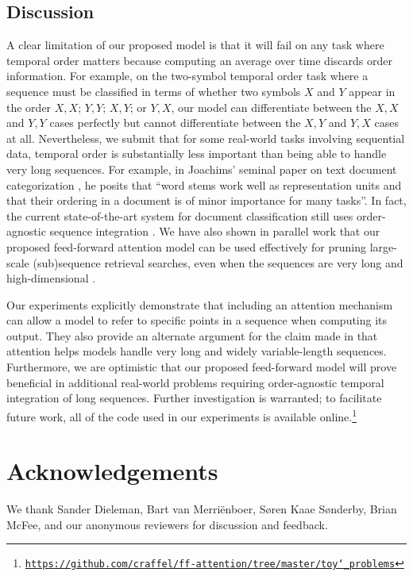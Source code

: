 \documentclass{article} %
\begin{document}
\subsection{Discussion}
\label{sec:discussion}

A clear limitation of our proposed model is that it will fail on any task where temporal order matters because computing an average over time discards order information.
For example, on the two-symbol temporal order task \citep{hochreiter1997long} where a sequence must be classified in terms of whether two symbols $X$ and $Y$ appear in the order $X, X$; $Y, Y$; $X, Y$; or $Y, X$, our model can differentiate between the $X, X$ and $Y, Y$ cases perfectly but cannot differentiate between the $X, Y$ and $Y, X$ cases at all.
Nevertheless, we submit that for some real-world tasks involving sequential data, temporal order is substantially less important than being able to handle very long sequences.
For example, in Joachims' seminal paper on text document categorization \citep{joachims1998text}, he posits that ``word stems work well as representation units and that their ordering in a document is of minor importance for many tasks''.
In fact, the current state-of-the-art system for document classification still uses order-agnostic sequence integration \citep{lei2015molding}.
We have also shown in parallel work that our proposed feed-forward attention model can be used effectively for pruning large-scale (sub)sequence retrieval searches, even when the sequences are very long and high-dimensional \citep{raffel2016pruning}.

Our experiments explicitly demonstrate that including an attention mechanism can allow a model to refer to specific points in a sequence when computing its output.
They also provide an alternate argument for the claim made in \citep{bahdanau2014neural} that attention helps models handle very long and widely variable-length sequences.
Furthermore, we are optimistic that our proposed feed-forward model will prove beneficial in additional real-world problems requiring order-agnostic temporal integration of long sequences.
Further investigation is warranted; to facilitate future work, all of the code used in our experiments is available online.\footnote{\href{https://github.com/craffel/ff-attention/tree/master/toy_problems}{\texttt{https://github.com/craffel/ff-attention/tree/master/toy\char`_problems}}}

\section{Acknowledgements}

We thank Sander Dieleman, Bart van Merri{\"e}nboer, S{\o}ren Kaae S{\o}nderby, Brian McFee, and our anonymous reviewers for discussion and feedback.

\clearpage



\end{document}
